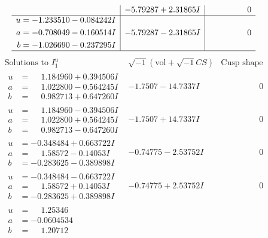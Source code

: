 \documentclass[1p]{elsarticle_modified}
\theoremstyle{definition}
\newcommand{\I}{\sqrt{-1}}
\begin{document}
$$\begin{array}{c|c|c}
 & -5.79287 + 2.31865 I & \phantom{-0.000000 } 0 \\ \hline\begin{aligned}
u &= -1.233510 - 0.084242 I \\
a &= -0.708049 - 0.160514 I \\
b &= -1.026690 - 0.237295 I\end{aligned}
 & -5.79287 - 2.31865 I & \phantom{-0.000000 } 0\\
 \hline 
 \end{array}$$\newpage$$\begin{array}{c|c|c}  
\text{Solutions to }I^u_{1}& \I (\text{vol} + \sqrt{-1}CS) & \text{Cusp shape}\\
 \hline 
\begin{aligned}
u &= \phantom{-}1.184960 + 0.394506 I \\
a &= \phantom{-}1.022800 - 0.564245 I \\
b &= \phantom{-}0.982713 + 0.647260 I\end{aligned}
 & -1.7507 - 14.7337 I & \phantom{-0.000000 } 0 \\ \hline\begin{aligned}
u &= \phantom{-}1.184960 - 0.394506 I \\
a &= \phantom{-}1.022800 + 0.564245 I \\
b &= \phantom{-}0.982713 - 0.647260 I\end{aligned}
 & -1.7507 + 14.7337 I & \phantom{-0.000000 } 0 \\ \hline\begin{aligned}
u &= -0.348484 + 0.663722 I \\
a &= \phantom{-}1.58572 - 0.14053 I \\
b &= -0.283625 - 0.389898 I\end{aligned}
 & -0.74775 - 2.53752 I & \phantom{-0.000000 } 0 \\ \hline\begin{aligned}
u &= -0.348484 - 0.663722 I \\
a &= \phantom{-}1.58572 + 0.14053 I \\
b &= -0.283625 + 0.389898 I\end{aligned}
 & -0.74775 + 2.53752 I & \phantom{-0.000000 } 0 \\ \hline\begin{aligned}
u &= \phantom{-}1.25346\phantom{ +0.000000I} \\
a &= -0.0604534\phantom{ +0.000000I} \\
b &= \phantom{-}1.20712\phantom{ +0.000000I}\end{aligned}

\end{array}$$
\end{document}
